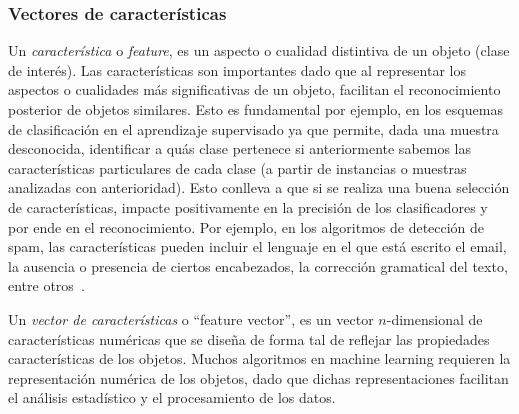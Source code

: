 \subsubsection{Vectores de características} \label{subsection:feature}

	Un \textit{característica} o \textit{feature}, es un aspecto o cualidad distintiva de un objeto (clase de interés). Las características son importantes dado que al representar los aspectos o cualidades más significativas de un objeto, facilitan el reconocimiento posterior de objetos similares. Esto es fundamental por ejemplo, en los esquemas de clasificación en el aprendizaje supervisado ya que permite, dada una muestra desconocida, identificar a quás clase pertenece si anteriormente sabemos las características particulares de cada clase (a partir de instancias o muestras analizadas con anterioridad). Esto conlleva a que si se realiza una buena selección de características, impacte positivamente en la precisión de los clasificadores y por ende en el reconocimiento. Por ejemplo, en los algoritmos de detección de spam, las características pueden incluir el lenguaje en el que está escrito el email, la ausencia o presencia de ciertos encabezados, la corrección gramatical del texto, entre otros~\cite{SpamPaper}.

	Un \textit{vector de características} o ``feature vector'', es un  vector $n$-dimensional de características numéricas que se diseña de forma tal de reflejar las propiedades características de los objetos. Muchos algoritmos en machine learning requieren la representación numérica de los objetos, dado que dichas representaciones facilitan el análisis estadístico y el procesamiento de los datos.
		
	
		
	
